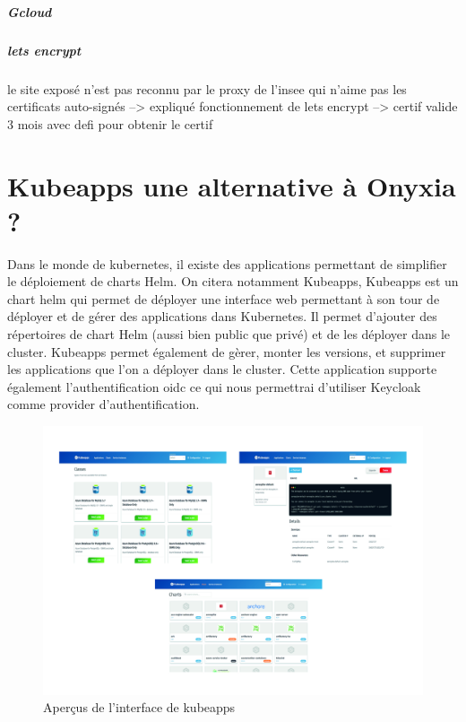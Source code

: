 \documentclass[11pt,fleqn]{book} %
\begin{document}
\paragraph{Gcloud}





\paragraph{lets encrypt}
le site exposé n'est pas reconnu par le proxy de l'insee qui n'aime pas les certificats auto-signés --> expliqué fonctionnement de lets encrypt --> certif valide 3 mois avec defi pour obtenir le certif


\chapter{Kubeapps une alternative à Onyxia ?}
\vspace{-2cm}
Dans le monde de kubernetes, il existe des applications permettant de simplifier le déploiement de charts Helm. On citera notamment Kubeapps, Kubeapps est un chart helm qui permet de déployer une interface web permettant à son tour de déployer et de gérer des applications dans Kubernetes. Il permet d'ajouter des répertoires de chart Helm (aussi bien public que privé) et de les déployer dans le cluster. Kubeapps permet également de gèrer, monter les versions, et supprimer les applications que l'on a déployer dans le cluster. Cette application supporte également l'authentification oidc ce qui nous permettrai d'utiliser Keycloak comme provider d'authentification.

\begin{figure}[H]\centering
\renewcommand{\figurename}{Graphique}
\hspace{-1cm}
\includegraphics[scale=0.12]{Pictures/onyxia/kubeapps.jpg}
\captionsetup{margin=1.5cm,format=hang,justification=justified}
\caption[]{Aperçus de l'interface de kubeapps \newline}
\end{figure}
\end{document}
